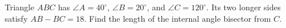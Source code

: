 Triangle $ABC$ has $\angle A=40^\circ$, $\angle B=20^\circ$, and $\angle C=120^\circ$. Its two longer sides satisfy $AB-BC=18$. Find the length of the internal angle bisector from $C$.
